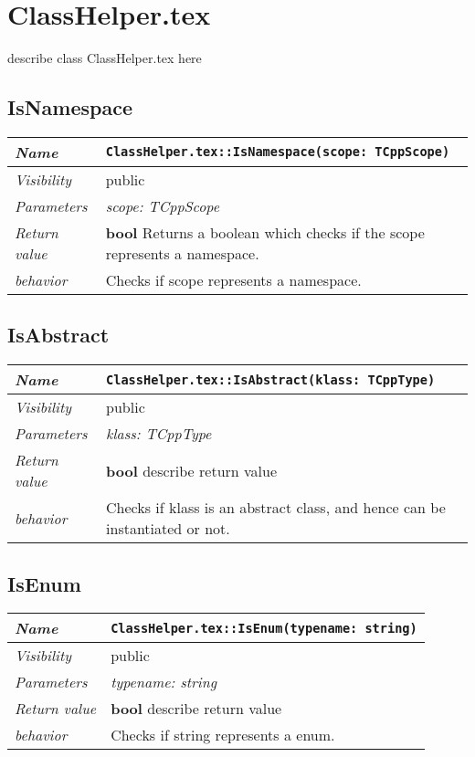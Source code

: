 \chapter{ClassHelper.tex}
describe class ClassHelper.tex here
\section{IsNamespace}
\begin{longtable}{p{3cm} @{\hskip 1cm} p{12cm}}
 \hline
\textit{Name} & \texttt{ClassHelper.tex::IsNamespace(scope: TCppScope)}\\
\hline
 \textit{Visibility} & public\\
\hline
\textit{Parameters} & \textit{scope: TCppScope}\\
\hline
\textit{Return value} & \textbf{ bool} Returns a boolean which checks if the scope represents a namespace.\\
  \hline
 \textit{behavior} & Checks if scope represents a namespace. \\
\hline
\end{longtable} \pagebreak
 \section{IsAbstract}
\begin{longtable}{p{3cm} @{\hskip 1cm} p{12cm}}
 \hline
\textit{Name} & \texttt{ClassHelper.tex::IsAbstract(klass: TCppType)}\\
\hline
 \textit{Visibility} & public\\
\hline
\textit{Parameters} & \textit{klass: TCppType}\\
\hline
\textit{Return value} & \textbf{ bool} describe return value\\
  \hline
 \textit{behavior} & Checks if klass is an abstract class, and hence can be instantiated or not. \\
\hline
\end{longtable} \pagebreak
 \section{IsEnum}
\begin{longtable}{p{3cm} @{\hskip 1cm} p{12cm}}
 \hline
\textit{Name} & \texttt{ClassHelper.tex::IsEnum(typename: string)}\\
\hline
 \textit{Visibility} & public\\
\hline
\textit{Parameters} & \textit{typename: string}\\
\hline
\textit{Return value} & \textbf{ bool} describe return value\\
  \hline
 \textit{behavior} & Checks if string represents a enum. \\
\hline
\end{longtable} \pagebreak
